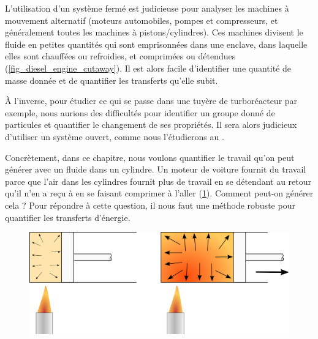 		L’utilisation d’un système fermé est judicieuse pour analyser les machines à mouvement alternatif (moteurs automobiles, pompes et compresseurs, et généralement toutes les machines à pistons/cylindres). Ces machines divisent le fluide en petites quantités qui sont emprisonnées dans une enclave, dans laquelle elles sont chauffées ou refroidies, et comprimées ou détendues (\cref{fig_diesel_engine_cutaway}). Il est alors facile d’identifier une quantité de masse donnée et de quantifier les transferts qu’elle subit.
		
		À l’inverse, pour étudier ce qui se passe dans une tuyère de turboréacteur par exemple, nous aurions des difficultés pour identifier un groupe donné de particules et quantifier le changement de ses propriétés. Il sera alors judicieux d’utiliser un système ouvert, comme nous l’étudierons au \courstrois.
		
		Concrètement, dans ce chapitre, nous voulons quantifier le travail qu’on peut générer avec un fluide dans un cylindre. Un moteur de voiture fournit du travail parce que l’air dans les cylindres fournit plus de travail en se détendant au retour qu’il n’en a reçu à en se faisant comprimer à l’aller (\cref{fig_moteur_sf}). Comment peut-on générer cela ? Pour répondre à cette question, il nous faut une méthode robuste pour quantifier les transferts d’énergie.

		\begin{figure}
			\begin{center}
			\includegraphics[width=\textwidth]{images/fonctionnement_base_moteur.png}
			\end{center}
			\label{fig_moteur_sf}
		\end{figure}


